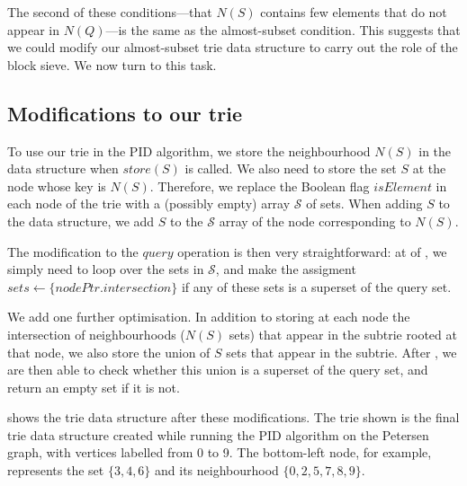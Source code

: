 The second of these conditions---that $N(S)$ contains few elements that do not
appear in $N(Q)$---is the same as the almost-subset condition.  This suggests
that we could modify our almost-subset trie data structure to carry out the
role of the block sieve.  We now turn to this task.

\subsection{Modifications to our trie}

To use our trie in the PID algorithm, we store the neighbourhood $N(S)$ in the
data structure when $\mathit{store}(S)$ is called.  We also need to store the set
$S$ at the node whose key is $N(S)$.  Therefore, we replace the Boolean flag
$\mathit{isElement}$ in each node of the trie with a (possibly empty) array $\mathcal{S}$
of sets.  When adding $S$ to the data structure, we add $S$ to the $\mathcal{S}$
array of the node corresponding to $N(S)$.

The modification to the $\mathit{query}$ operation is then very
straightforward: at  of , we simply
need to loop over the sets in $\mathcal{S}$, and make the assigment
$\mathit{sets} \gets \{\mathit{nodePtr}.\mathit{intersection}\}$ if any of
these sets is a superset of the query set.

We add one further optimisation.  In addition to storing at each node the
intersection of neighbourhoods ($N(S)$ sets) that appear in the subtrie rooted
at that node, we also store the union of $S$ sets that appear in the subtrie.
After , we are then able to check whether
this union is a superset of the query set, and return an empty set if it is
not.

 shows the trie data structure after these modifications.
The trie shown is the final trie data structure created while running the PID
algorithm on the Petersen graph, with vertices labelled from 0 to 9.
The bottom-left node, for example, represents the set $\{3,4,6\}$ and its
neighbourhood $\{0,2,5,7,8,9\}$.

